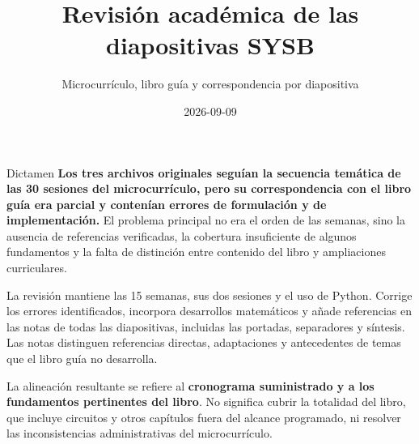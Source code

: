 \documentclass[
  10pt,
  ignorenonframetext,
  aspectratio=169,
  spanish,
]{beamer}
\title{Revisión académica de las diapositivas SYSB}
\subtitle{Microcurrículo, libro guía y correspondencia por diapositiva}
\author{}
\date{2026-09-09}
\begin{document}
\frame{\titlepage}


\begin{frame}{Dictamen}
\label{dictamen}
\textbf{Los tres archivos originales seguían la secuencia temática de
las 30 sesiones del microcurrículo, pero su correspondencia con el libro
guía era parcial y contenían errores de formulación y de
implementación.} El problema principal no era el orden de las semanas,
sino la ausencia de referencias verificadas, la cobertura insuficiente
de algunos fundamentos y la falta de distinción entre contenido del
libro y ampliaciones curriculares.

La revisión mantiene las 15 semanas, sus dos sesiones y el uso de
Python. Corrige los errores identificados, incorpora desarrollos
matemáticos y añade referencias en las notas de todas las diapositivas,
incluidas las portadas, separadores y síntesis. Las notas distinguen
referencias directas, adaptaciones y antecedentes de temas que el libro
guía no desarrolla.

La alineación resultante se refiere al \textbf{cronograma suministrado y
a los fundamentos pertinentes del libro}. No significa cubrir la
totalidad del libro, que incluye circuitos y otros capítulos fuera del
alcance programado, ni resolver las inconsistencias administrativas del
microcurrículo.
\end{frame}
\end{document}
